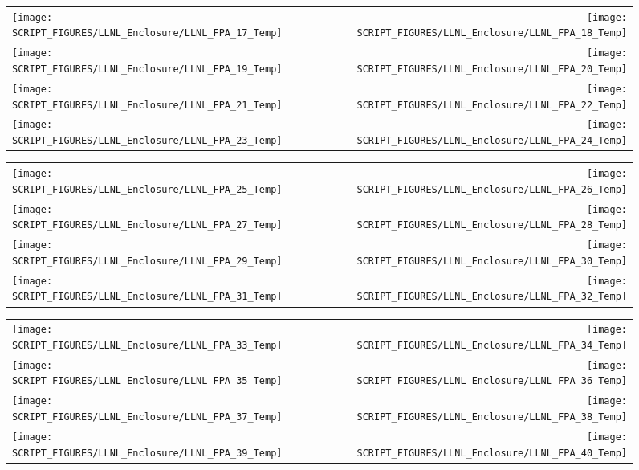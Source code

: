 \begin{figure}[p]
\begin{tabular*}{\textwidth}{l@{\extracolsep{\fill}}r}
\texttt{[image: SCRIPT\_FIGURES/LLNL\_Enclosure/LLNL\_FPA\_17\_Temp]} &
\texttt{[image: SCRIPT\_FIGURES/LLNL\_Enclosure/LLNL\_FPA\_18\_Temp]} \\
\texttt{[image: SCRIPT\_FIGURES/LLNL\_Enclosure/LLNL\_FPA\_19\_Temp]} &
\texttt{[image: SCRIPT\_FIGURES/LLNL\_Enclosure/LLNL\_FPA\_20\_Temp]} \\
\texttt{[image: SCRIPT\_FIGURES/LLNL\_Enclosure/LLNL\_FPA\_21\_Temp]} &
\texttt{[image: SCRIPT\_FIGURES/LLNL\_Enclosure/LLNL\_FPA\_22\_Temp]} \\
\texttt{[image: SCRIPT\_FIGURES/LLNL\_Enclosure/LLNL\_FPA\_23\_Temp]} &
\texttt{[image: SCRIPT\_FIGURES/LLNL\_Enclosure/LLNL\_FPA\_24\_Temp]}
\end{tabular*}
\end{figure}

\begin{figure}[p]
\begin{tabular*}{\textwidth}{l@{\extracolsep{\fill}}r}
\texttt{[image: SCRIPT\_FIGURES/LLNL\_Enclosure/LLNL\_FPA\_25\_Temp]} &
\texttt{[image: SCRIPT\_FIGURES/LLNL\_Enclosure/LLNL\_FPA\_26\_Temp]} \\
\texttt{[image: SCRIPT\_FIGURES/LLNL\_Enclosure/LLNL\_FPA\_27\_Temp]} &
\texttt{[image: SCRIPT\_FIGURES/LLNL\_Enclosure/LLNL\_FPA\_28\_Temp]} \\
\texttt{[image: SCRIPT\_FIGURES/LLNL\_Enclosure/LLNL\_FPA\_29\_Temp]} &
\texttt{[image: SCRIPT\_FIGURES/LLNL\_Enclosure/LLNL\_FPA\_30\_Temp]} \\
\texttt{[image: SCRIPT\_FIGURES/LLNL\_Enclosure/LLNL\_FPA\_31\_Temp]} &
\texttt{[image: SCRIPT\_FIGURES/LLNL\_Enclosure/LLNL\_FPA\_32\_Temp]}
\end{tabular*}
\end{figure}

\begin{figure}[p]
\begin{tabular*}{\textwidth}{l@{\extracolsep{\fill}}r}
\texttt{[image: SCRIPT\_FIGURES/LLNL\_Enclosure/LLNL\_FPA\_33\_Temp]} &
\texttt{[image: SCRIPT\_FIGURES/LLNL\_Enclosure/LLNL\_FPA\_34\_Temp]} \\
\texttt{[image: SCRIPT\_FIGURES/LLNL\_Enclosure/LLNL\_FPA\_35\_Temp]} &
\texttt{[image: SCRIPT\_FIGURES/LLNL\_Enclosure/LLNL\_FPA\_36\_Temp]} \\
\texttt{[image: SCRIPT\_FIGURES/LLNL\_Enclosure/LLNL\_FPA\_37\_Temp]} &
\texttt{[image: SCRIPT\_FIGURES/LLNL\_Enclosure/LLNL\_FPA\_38\_Temp]} \\
\texttt{[image: SCRIPT\_FIGURES/LLNL\_Enclosure/LLNL\_FPA\_39\_Temp]} &
\texttt{[image: SCRIPT\_FIGURES/LLNL\_Enclosure/LLNL\_FPA\_40\_Temp]}
\end{tabular*}
\end{figure}

